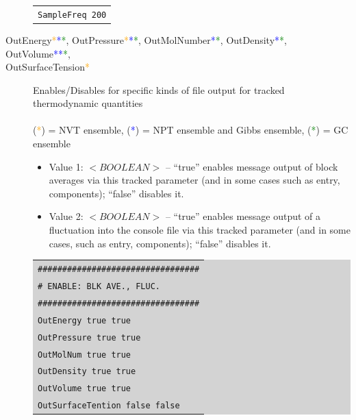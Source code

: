 \begin{description}
{\begin{tabular}{l}
	\texttt{SampleFreq 200}\\
	\end{tabular}}
\item [OutEnergy\textcolor{orange}{*}\textcolor{blue}{*}\textcolor{green}{*}, OutPressure\textcolor{orange}{*}\textcolor{blue}{*}\textcolor{green}{*}, OutMolNumber\textcolor{blue}{*}\textcolor{green}{*}, OutDensity\textcolor{blue}{*}\textcolor{green}{*}, OutVolume\textcolor{blue}{*}\textcolor{blue}{*}\textcolor{green}{*},\\ OutSurfaceTension\textcolor{orange}{*}] Enables/Disables for specific kinds of file output for tracked thermodynamic quantities\\\\
(\textcolor{orange}{*}) = NVT ensemble, (\textcolor{blue}{*}) = NPT ensemble and Gibbs ensemble, (\textcolor{green}{*}) = GC ensemble
	\begin{itemize}
	\item Value 1: $<BOOLEAN>$ – ``true'' enables message output of block averages via this tracked parameter (and in some cases such as entry, components); ``false'' disables it.
	\item Value 2: $<BOOLEAN>$ – ``true'' enables message output of a fluctuation into the console file via this tracked parameter (and in some cases, such as entry, components); ``false'' disables it.
	\end{itemize}
	\colorbox{lightgray}{
	\begin{tabular}{l}
	\texttt{\#\#\#\#\#\#\#\#\#\#\#\#\#\#\#\#\#\#\#\#\#\#\#\#\#\#\#\#\#\#\#\#\#}\\
	\texttt{\#  ENABLE: BLK AVE., FLUC.}\\
	\texttt{\#\#\#\#\#\#\#\#\#\#\#\#\#\#\#\#\#\#\#\#\#\#\#\#\#\#\#\#\#\#\#\#\#}\\
	\texttt{OutEnergy                      true    true}\\
	\texttt{OutPressure                   true    true}\\
	\texttt{OutMolNum                    true    true}\\
	\texttt{OutDensity                     true    true}\\
	\texttt{OutVolume                     true    true}\\
	\texttt{OutSurfaceTention         false   false}\\
	\end{tabular}}
\end{description}
\newpage

